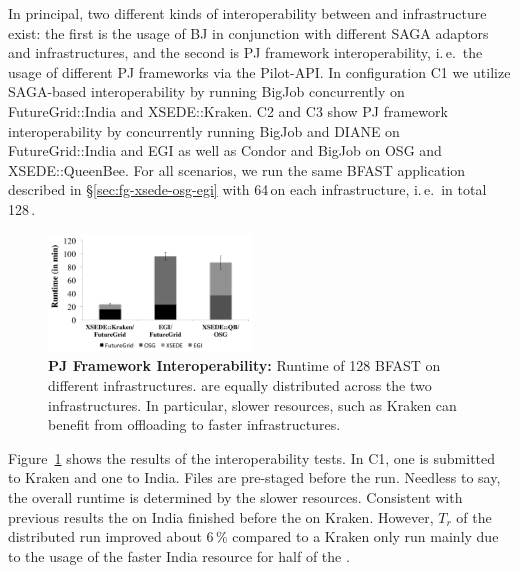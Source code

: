 \documentclass{sig-alternate}
\begin{document}
In principal, two different kinds of interoperability between
\pilotjobs and infrastructure exist: the first is the usage of BJ in
conjunction with different SAGA adaptors and infrastructures, and the
second is PJ framework interoperability, i.\,e.\ the usage of
different PJ frameworks via the Pilot-API. In configuration C1 we
utilize SAGA-based interoperability by running BigJob concurrently on
FutureGrid::India and XSEDE::Kraken. C2 and C3 show PJ
framework interoperability by concurrently running BigJob and DIANE on
FutureGrid::India and EGI as well as Condor and BigJob on OSG and
XSEDE::QueenBee. For all scenarios, we run the same BFAST application
described in \S\ref{sec:fg-xsede-osg-egi} with 64\,\cus on each
infrastructure, i.\,e.\ in total 128\,\cus.

\begin{figure}[htbp]
  	\centering
	\includegraphics[width=0.48\textwidth]{perf/interop/128-bfast-interop.pdf}
	\caption{\textbf{PJ Framework Interoperability:} Runtime of
          128 BFAST \cus on different infrastructures. \cus are
          equally distributed across the two infrastructures. In
          particular, slower resources, such as Kraken can benefit
          from offloading \cus to faster infrastructures.  }
	\label{fig:perf_interop_128-bfast-interop}
\end{figure}


Figure~\ref{fig:perf_interop_128-bfast-interop} shows the results of the
interoperability tests. In C1, one \pilot is submitted to Kraken and one to
India. Files are pre-staged before the run. Needless to say, the overall runtime
is determined by the slower resources. Consistent with previous results the
\pilot on India finished before the \pilot on Kraken. However, $T_r$ of the
distributed run improved about 6\,\% compared to a Kraken only run mainly due to
the usage of the faster India resource for half of the \cus.


\end{document}
